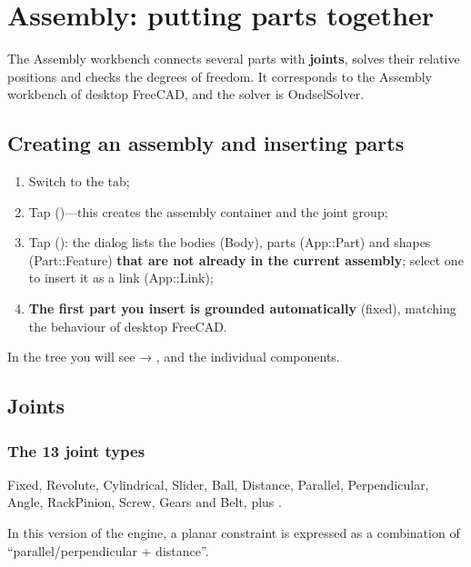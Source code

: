 \chapter{Assembly: putting parts together}

The Assembly workbench connects several parts with \textbf{joints}, solves their relative positions and
checks the degrees of freedom. It corresponds to the Assembly workbench of desktop FreeCAD, and the solver
is OndselSolver.

\section{Creating an assembly and inserting parts}

\begin{enumerate}
  \item Switch to the  tab;
  \item Tap  ()---this creates the assembly container and
        the joint group;
  \item Tap  ():
        the dialog lists the bodies (Body), parts (App::Part) and shapes (Part::Feature) \textbf{that are not
        already in the current assembly}; select one to insert it as a link (App::Link);
  \item \textbf{The first part you insert is grounded automatically} (fixed), matching the behaviour of
        desktop FreeCAD.
\end{enumerate}

In the tree you will see  → ,  and the individual components.

\section{Joints}

\subsection{The 13 joint types}

Fixed, Revolute, Cylindrical, Slider, Ball, Distance, Parallel, Perpendicular, Angle, RackPinion, Screw,
Gears and Belt, plus .

\begin{tip}
In this version of the engine, a planar constraint is expressed as a combination of
``parallel/perpendicular + distance''.
\end{tip}

